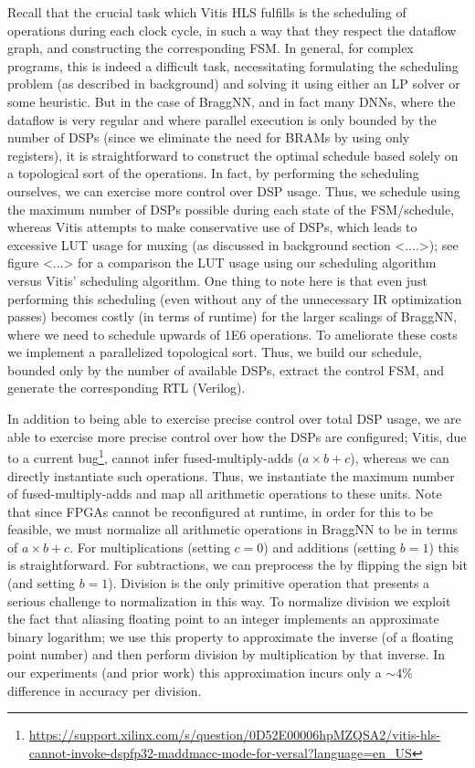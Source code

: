 Recall that the crucial task which Vitis HLS fulfills is the scheduling of operations during each clock cycle, in such a way that they respect the dataflow graph, and constructing the corresponding FSM.
In general, for complex programs, this is indeed a difficult task, necessitating formulating the scheduling problem (as described in background) and solving it using either an LP solver or some heuristic.
But in the case of BraggNN, and in fact many DNNs, where the dataflow is very regular and where parallel execution is only bounded by the number of DSPs (since we eliminate the need for BRAMs by using only registers), it is straightforward to construct the optimal schedule based solely on a topological sort of the operations.
In fact, by performing the scheduling ourselves, we can exercise more control over DSP usage.
Thus, we schedule using the maximum number of DSPs possible during each state of the FSM/schedule, whereas Vitis attempts to make conservative use of DSPs, which leads to excessive LUT usage for muxing (as discussed in background section <....>); see figure <...> for a comparison the LUT usage using our scheduling algorithm versus Vitis' scheduling algorithm.
One thing to note here is that even just performing this scheduling (even without any of the unnecessary IR optimization passes) becomes costly (in terms of runtime) for the larger scalings of BraggNN, where we need to schedule upwards of 1E6 operations.
To ameliorate these costs we implement a parallelized topological sort\cite{sanders2019sequential}.
Thus, we build our schedule, bounded only by the number of available DSPs, extract the control FSM, and generate the corresponding RTL (Verilog).

In addition to being able to exercise precise control over total DSP usage, we are able to exercise more precise control over how the DSPs are configured; Vitis, due to a current bug\footnote{\url{https://support.xilinx.com/s/question/0D52E00006hpMZQSA2/vitis-hls-cannot-invoke-dspfp32-maddmacc-mode-for-versal?language=en_US}}, cannot infer fused-multiply-adds ($a \times b + c$), whereas we can directly instantiate such operations.
Thus, we instantiate the maximum number of fused-multiply-adds and map all arithmetic operations to these units.
Note that since FPGAs cannot be reconfigured at runtime, in order for this to be feasible, we must normalize all arithmetic operations in BraggNN to be in terms of $a \times b + c$.
For multiplications (setting $c = 0$) and additions (setting $b = 1$) this is straightforward.
For subtractions, we can preprocess the  by flipping the sign bit (and setting $b = 1$).
Division is the only primitive operation that presents a serious challenge to normalization in this way.
To normalize division we exploit the fact that aliasing floating point to an integer implements an approximate binary logarithm\cite{enwiki:1081681080}; we use this property to approximate the inverse (of a floating point number) and then perform division by multiplication by that inverse.
In our experiments (and prior work\cite{10.1007/978-0-387-72258-0_14}) this approximation incurs only a $\sim 4\%$ difference in accuracy per division.

